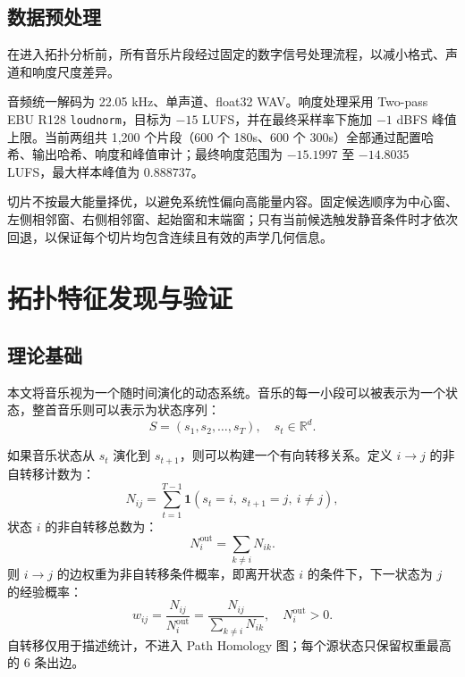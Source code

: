 \documentclass{article}
\begin{document}
\subsection{数据预处理}


在进入拓扑分析前，所有音乐片段经过固定的数字信号处理流程，以减小格式、声道和响度尺度差异。

音频统一解码为 22.05 kHz、单声道、float32 WAV。响度处理采用 Two-pass EBU R128 \verb|loudnorm|，目标为 $-15$ LUFS，并在最终采样率下施加 $-1$ dBFS 峰值上限。当前两组共 1,200 个片段（600 个 180s、600 个 300s）全部通过配置哈希、输出哈希、响度和峰值审计；最终响度范围为 $-15.1997$ 至 $-14.8035$ LUFS，最大样本峰值为 $0.888737$。

切片不按最大能量择优，以避免系统性偏向高能量内容。固定候选顺序为中心窗、左侧相邻窗、右侧相邻窗、起始窗和末端窗；只有当前候选触发静音条件时才依次回退，以保证每个切片均包含连续且有效的声学几何信息。

\section{拓扑特征发现与验证}

\subsection{理论基础}

本文将音乐视为一个随时间演化的动态系统。音乐的每一小段可以被表示为一个状态，整首音乐则可以表示为状态序列：
\[S=(s_1,s_2,\ldots,s_T),\quad s_t\in\mathbb R^d.\]

如果音乐状态从 $s_t$ 演化到 $s_{t+1}$，则可以构建一个有向转移关系。定义 $i \to j$ 的非自转移计数为：
\[N_{ij}=\sum_{t=1}^{T-1}
\mathbf 1(s_t=i,\ s_{t+1}=j,\ i\neq j),\]
状态 $i$ 的非自转移总数为：
\[N_i^{\text{out}}=\sum_{k\neq i}N_{ik}.\]
则 $i \to j$ 的边权重为非自转移条件概率，即离开状态 $i$ 的条件下，下一状态为 $j$ 的经验概率：
\[
w_{ij}
=
\frac{N_{ij}}{N_i^{\mathrm{out}}}
=
\frac{N_{ij}}{\sum_{k\neq i}N_{ik}},
\quad N_i^{\mathrm{out}}>0.\]
自转移仅用于描述统计，不进入 Path Homology 图；每个源状态只保留权重最高的 6 条出边。
\end{document}
